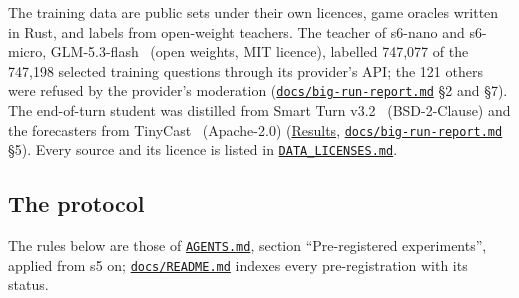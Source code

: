 \documentclass[10pt]{article}
\begin{document}
The training data are public sets under their own licences, game oracles written in Rust, and labels from open-weight teachers. The teacher of s6-nano and s6-micro, GLM-5.3-flash~\cite{glm53flash} (open weights, MIT licence), labelled 747,077 of the 747,198 selected training questions through its provider's API; the 121 others were refused by the provider's moderation (\href{https://github.com/maxgfr/skycmd/blob/main/docs/big-run-report.md}{\texttt{docs/\allowbreak{}big-run-report.md}} \S{}2 and \S{}7). The end-of-turn student was distilled from Smart Turn v3.2~\cite{smartturn} (BSD-2-Clause) and the forecasters from TinyCast~\cite{tinycast} (Apache-2.0) (\href{https://maxgfr.github.io/skycmd/results/\#s6-ear2-nano-passed}{Results}, \href{https://github.com/maxgfr/skycmd/blob/main/docs/big-run-report.md}{\texttt{docs/\allowbreak{}big-run-report.md}} \S{}5). Every source and its licence is listed in \href{https://github.com/maxgfr/skycmd/blob/main/DATA_LICENSES.md}{\texttt{DATA\_\allowbreak{}LICENSES.md}}.

\subsection{The protocol}\label{sec:3.2}

The rules below are those of \href{https://github.com/maxgfr/skycmd/blob/main/AGENTS.md}{\texttt{AGENTS.md}}, section ``Pre-registered experiments'', applied from s5 on; \href{https://github.com/maxgfr/skycmd/blob/main/docs/README.md}{\texttt{docs/\allowbreak{}README.md}} indexes every pre-registration with its status.
\end{document}
